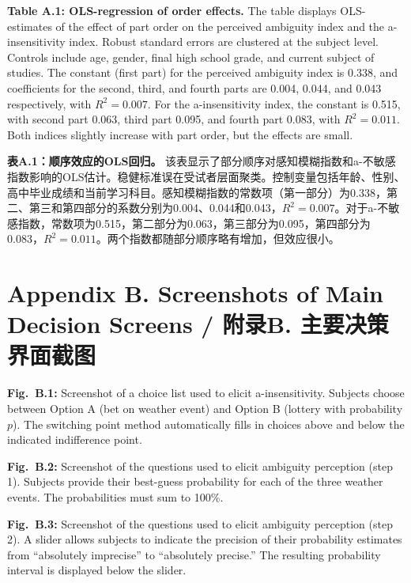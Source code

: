 \documentclass[12pt,a4paper]{article}
\newenvironment{original}
  {\par\medskip\noindent\color{black}\ignorespaces}
  {\par\medskip}
\newenvironment{translation}
  {\par\noindent\color{transblue}\ignorespaces}
  {\par\medskip\medskip}
\begin{document}
\begin{original}
\textbf{Table A.1: OLS-regression of order effects.} The table displays OLS-estimates of the effect of part order on the perceived ambiguity index and the a-insensitivity index. Robust standard errors are clustered at the subject level. Controls include age, gender, final high school grade, and current subject of studies. The constant (first part) for the perceived ambiguity index is 0.338, and coefficients for the second, third, and fourth parts are 0.004, 0.044, and 0.043 respectively, with $R^2 = 0.007$. For the a-insensitivity index, the constant is 0.515, with second part 0.063, third part 0.095, and fourth part 0.083, with $R^2 = 0.011$. Both indices slightly increase with part order, but the effects are small.
\end{original}

\begin{translation}
\textbf{表A.1：顺序效应的OLS回归。} 该表显示了部分顺序对感知模糊指数和a-不敏感指数影响的OLS估计。稳健标准误在受试者层面聚类。控制变量包括年龄、性别、高中毕业成绩和当前学习科目。感知模糊指数的常数项（第一部分）为0.338，第二、第三和第四部分的系数分别为0.004、0.044和0.043，$R^2 = 0.007$。对于a-不敏感指数，常数项为0.515，第二部分为0.063，第三部分为0.095，第四部分为0.083，$R^2 = 0.011$。两个指数都随部分顺序略有增加，但效应很小。
\end{translation}

\newpage
\section*{Appendix B. Screenshots of Main Decision Screens / 附录B. 主要决策界面截图}

\begin{original}
\textbf{Fig.\ B.1:} Screenshot of a choice list used to elicit a-insensitivity. Subjects choose between Option A (bet on weather event) and Option B (lottery with probability $p$). The switching point method automatically fills in choices above and below the indicated indifference point.

\textbf{Fig.\ B.2:} Screenshot of the questions used to elicit ambiguity perception (step 1). Subjects provide their best-guess probability for each of the three weather events. The probabilities must sum to 100\%.

\textbf{Fig.\ B.3:} Screenshot of the questions used to elicit ambiguity perception (step 2). A slider allows subjects to indicate the precision of their probability estimates from ``absolutely imprecise'' to ``absolutely precise.'' The resulting probability interval is displayed below the slider.
\end{original}
\end{document}
